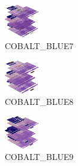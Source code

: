 \hspace{0.1cm}
\begin{minipage}[b]{0.15\linewidth}
\begin{figure}[H]                                                          
  \centering                                                             
  \begin{adjustbox}{width=1.5cm,center}                                   
  \includegraphics[width=1.5cm]{src/colorspace_colourflow/flows/colourflow_103-45.png}%
  \end{adjustbox}                                                        
\caption*{COBALT\_BLUE7}                                           
\end{figure}                                                               
\end{minipage}
\hspace{0.1cm}
\begin{minipage}[b]{0.15\linewidth}
\begin{figure}[H]                                                          
  \centering                                                             
  \begin{adjustbox}{width=1.5cm,center}                                   
  \includegraphics[width=1.5cm]{src/colorspace_colourflow/flows/colourflow_104-45.png}%
  \end{adjustbox}                                                        
\caption*{COBALT\_BLUE8}                                           
\end{figure}                                                               
\end{minipage}
\hspace{0.1cm}
\begin{minipage}[b]{0.15\linewidth}
\begin{figure}[H]                                                          
  \centering                                                             
  \begin{adjustbox}{width=1.5cm,center}                                   
  \includegraphics[width=1.5cm]{src/colorspace_colourflow/flows/colourflow_105-45.png}%
  \end{adjustbox}                                                        
\caption*{COBALT\_BLUE9}                                           
\end{figure}                                                               
\end{minipage}
